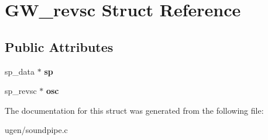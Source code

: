 \hypertarget{structGW__revsc}{}\section{G\+W\+\_\+revsc Struct Reference}
\label{structGW__revsc}
\subsection*{Public Attributes}
\begin{DoxyCompactItemize}
\item 
\hypertarget{structGW__revsc_a1795bff1212f84857c183d327b38a6f5}{}\label{structGW__revsc_a1795bff1212f84857c183d327b38a6f5} 
sp\+\_\+data $\ast$ {\bfseries sp}
\item 
\hypertarget{structGW__revsc_ac1ffb54094611754cab2a94d1637c89a}{}\label{structGW__revsc_ac1ffb54094611754cab2a94d1637c89a} 
sp\+\_\+revsc $\ast$ {\bfseries osc}
\end{DoxyCompactItemize}


The documentation for this struct was generated from the following file\+:\begin{DoxyCompactItemize}
\item 
ugen/soundpipe.\+c\end{DoxyCompactItemize}
